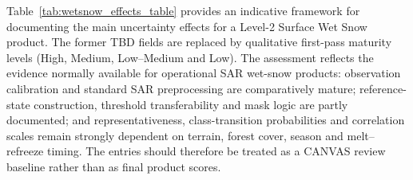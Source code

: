Table~\ref{tab:wetsnow_effects_table} provides an indicative framework for documenting the main uncertainty effects for a Level-2 Surface Wet Snow product. The former TBD fields are replaced by qualitative first-pass maturity levels (High, Medium, Low--Medium and Low). The assessment reflects the evidence normally available for operational SAR wet-snow products: observation calibration and standard SAR preprocessing are comparatively mature; reference-state construction, threshold transferability and mask logic are partly documented; and representativeness, class-transition probabilities and correlation scales remain strongly dependent on terrain, forest cover, season and melt--refreeze timing. The entries should therefore be treated as a CANVAS review baseline rather than as final product scores.

\begin{table}[H]
  \scriptsize
  \centering
  \caption{Indicative uncertainty effects table for Level-2 Surface Wet Snow classification. Entries are qualitative first-pass assessments for the CANVAS review and should be replaced by product-specific evidence where available.}
\end{table}
